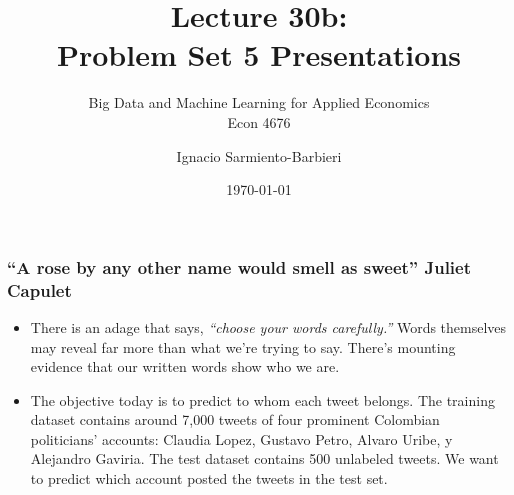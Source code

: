 \documentclass[
  shownotes,
  xcolor={svgnames},
  hyperref={colorlinks,citecolor=DarkBlue,linkcolor=DarkRed,urlcolor=DarkBlue}
  , aspectratio=169]{beamer}
\begin{document}
\title[Lecture 30b]{Lecture 30b: \\ Problem Set 5 Presentations}
\subtitle{Big Data and Machine Learning for Applied Economics \\ Econ 4676}
\date{\today}

\author[Sarmiento-Barbieri]{Ignacio Sarmiento-Barbieri}


\begin{frame}[noframenumbering]
\maketitle
\end{frame}



\begin{frame}
\frametitle{``A rose by any other name would smell as sweet'' Juliet Capulet }

\begin{itemize}

\item There is an adage that says, {\it “choose your words carefully.”} Words themselves may reveal far more than what we’re trying to say. There’s mounting evidence that our written words show who we are.
\medskip
\item The objective today is to predict to whom each tweet belongs. The training dataset contains around 7,000 tweets of four prominent Colombian politicians' accounts: Claudia Lopez, Gustavo Petro, Alvaro Uribe, y Alejandro Gaviria. The test dataset contains 500 unlabeled tweets. We want to predict which account posted the tweets in the test set. 
\end{itemize}
\end{frame}
\end{document}
